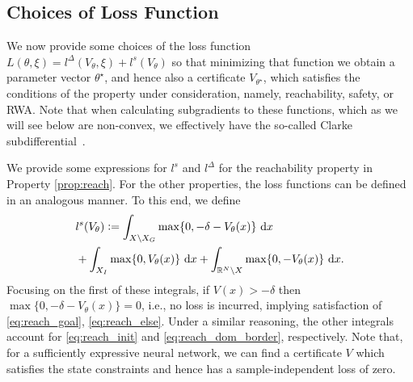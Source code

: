 \subsection{Choices of Loss Function}
We now provide some choices of the loss function $L(\theta,\xi)=l^\Delta(V_\theta, \xi) + l^s(V_\theta)$ so that minimizing that function we obtain a parameter vector $\theta^\star$, and hence also a certificate $V_{\theta^\star}$, which satisfies the conditions of the property under consideration, namely, reachability, safety, or RWA.
Note that when calculating subgradients to these functions, which as we will see below are non-convex, we effectively have the so-called Clarke subdifferential~\cite{doi:10.1137/1.9781611971309}.

We provide some expressions for $l^s$ and $l^\Delta$ for the reachability property in Property \ref{prop:reach}. 
For the other properties, the loss functions can be defined in an analogous manner. 
To this end, we define
\begin{align}
    &l^s(V_\theta) \vcentcolon= \int_{X \setminus X_G}\max\{0,-\delta-V_\theta(x)\} ~\mathrm{d}x \\ &+\int_{X_I}\max\{0,V_\theta(x)\}   ~\mathrm{d}x+\int_{\mathbb{R}^N \setminus X} \max\{0,-V_\theta(x)\}  ~\mathrm{d}x.\nonumber
\end{align}
Focusing on the first of these integrals, if $V(x) > -\delta$ then $\max\{0, -\delta-V_\theta(x)\}=0$, i.e., no loss is incurred, implying satisfaction of \eqref{eq:reach_goal}, \eqref{eq:reach_else}. 
Under a similar reasoning, the other integrals account for \eqref{eq:reach_init} and \eqref{eq:reach_dom_border}, respectively. 
Note that, for a sufficiently expressive neural network, we can find a certificate $V$ which satisfies the state constraints and hence has a sample-independent loss of zero.

